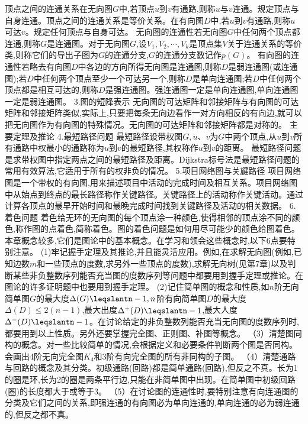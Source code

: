 顶点之间的连通关系在无向图$G$中,若顶点$u$到$v$有通路,则称$u$与$v$连通。规定顶点与自身连通。顶点之间的连通关系是等价关系。在有向图$D$中,若$u$到$v$有通路,则称$u$可达$v$。规定任何顶点与自身可达。
无向图的连通性若无向图$G$中任何两个顶点都连通,则称$G$是连通图。对于无向图$G$,设$V_{1},V_{2},\cdots,V_{k}$是顶点集$V$关于连通关系的等价类,则称它们的导出子图为$G$的连通分支,$G$的连通分支数记作$p(G)$。
有向图的连通性若略去有向图$D$中各边的方向所得无向图是连通图,则称$D$是弱连通图(或连通图);若$D$中任何两个顶点至少一个可达另一个,则称$D$是单向连通图;若$D$中任何两个顶点都是相互可达的,则称$D$是强连通图。强连通图一定是单向连通图,单向连通图一定是弱连通图。
{3.图的短䧏表示}
无向图的可达矩阵和邻接矩阵与有向图的可达矩阵和邻接矩阵类似,实际上,只要把每条无向边看作一对方向相反的有向边,就可以把无向图作为有向图的特殊情况。无向图的可达矩阵和邻接矩阵都是对称的。
{主要定理及推论}
{4.最短路径问题}
最短路径设带权图$G,u、v$为$G$中两个顶点,从$u$到$v$所有通路中权最小的通路称为$u$到$v$的最短路径,其权称作$u$到$v$的距离。
最短路径问题是求带权图中指定两点之间的最短路径及距离。Dijkstra标号法是最短路径问题的常用有效算法,它适用于所有的权非负的情况。
{5.项目网络图与关旔路径}
项目网络图是一个带权的有向图,用来描述项目中活动的完成时间及相互关系。项目网络图中从始点到终点的最长路径称作关键路径。关键路径上的活动称作关键活动。通过计算各顶点的最早开始时间和最晩完成时间找到关键路径及活动的相关数据。
{6.着色问题}
着色给无环的无向图的每个顶点涂一种颜色,使得相邻的顶点涂不同的颜色,称作图的点着色,简称着色。图的着色问题是如何用尽可能少的颜色给图着色。
本章概念较多,它们是图论中的基本概念。在学习和领会这些概念时,以下6点要特别注意。
(1)牢记握手定理及其推论,并且能灵活应用。例如,在求解无向图(例如,已知边数$m$和一些顶点的度数,求另外一些顶点的度数),求解无向树(见第7章)以及判断某些非负整数序列能否充当图的度数序列等问题中都要用到握手定理或推论。在图论的许多证明题中也要用到握手定理。
(2)记住简单图的概念和性质,如$n$阶无向简单图$G$的最大度$\Delta(G)\leqslantn-1,n$阶有向简单图$D$的最大度$\Delta(D)\leqslant2(n-1)$,最大出度$\Delta^{+}(D)\leqslantn-1$,最大人度$\Delta^{-}(D)\leqslantn-1$。在讨论给定的非负整数列能否充当无向图的度数序列时,都要用到以上性质。另外还要掌握完全图、正则图、补图等概念。
（3）清楚图同构的概念。对一些比较简单的情况,会根据定义和必要条件判断两个图是否同构。会画出4阶无向完全图$K_{4}$和3阶有向完全图的所有非同构的子图。
（4）清楚通路与回路的概念及其分类。初级通路(回路)都是简单通路(回路),但反之不真。长为1的圈是环,长为2的圈是两条平行边,只能在非简单图中出现。在简单图中初级回路(圈)的长度都大于或等于3。
（5）在讨论图的连通性时,要特别注意有向连通图的分类及它们之间的关系,即强连通的有向图必为单向连通的,单向连通的必为弱连通的,但反之都不真。
